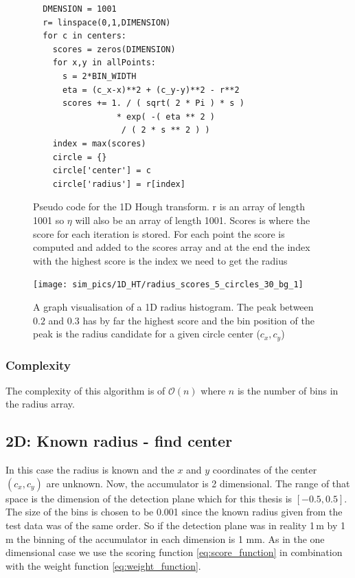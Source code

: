 \documentclass[11pt,twoside]{scrreprt}
\begin{document}
\begin{figure}[htb]
  \begin{lstlisting}
  DMENSION = 1001
  r= linspace(0,1,DIMENSION)
  for c in centers:
    scores = zeros(DIMENSION)
    for x,y in allPoints:
      s = 2*BIN_WIDTH
      eta = (c_x-x)**2 + (c_y-y)**2 - r**2
      scores += 1. / ( sqrt( 2 * Pi ) * s ) 
                 * exp( -( eta ** 2 ) 
                  / ( 2 * s ** 2 ) )
    index = max(scores)
    circle = {}
    circle['center'] = c
    circle['radius'] = r[index]
\end{lstlisting}
\caption[Pseudo Code 1D HT]{Pseudo code for the 1D Hough transform. r is an array of length 1001 so $\eta$ will also be an 
array of length 1001. Scores is where the score for each iteration is stored. For each point the score is computed and added 
to the scores array and at the end the index with the highest score is the index we need to get the radius}\label{pc:1dHT}
\end{figure}

\begin{figure}[tb]
  \centering
  \texttt{[image: sim\_pics/1D\_HT/radius\_scores\_5\_circles\_30\_bg\_1]}
  \caption[Graph visualisation of a 1D radius histogram]{A graph visualisation of a 1D radius histogram. The peak between $0.2$ 
  and $0.3$ has by far the highest score and the bin
  position of the peak is the radius candidate for a given circle center ($c_x, c_y$)}
  \label{fig:1d_ht_radius_score}
\end{figure}

\subsubsection{Complexity} %
The complexity of this algorithm is of $\mathcal{O}(n)$ where $n$ is the number of bins in the radius array.
\label{ssub:complexity_1d}


\subsection{2D: Known radius - find center} %
\label{sub:2d_known_radius_find_center}
In this case the radius is known and the $x$ and $y$ coordinates of the center $(c_x, c_y)$ are unknown. Now, the accumulator is 2 
dimensional. The range of that space is the dimension of the detection plane which for this thesis is $[-0.5,0.5]$. The size of the 
bins is chosen to be 0.001 since the known radius given from the test data was of the same order. So if the detection plane was in 
reality 1\,m by 1\,m the binning of the accumulator in each dimension is 1 mm. As in the one dimensional case we use the scoring function 
\ref{eq:score_function} in combination with the weight function \ref{eq:weight_function}.
\end{document}
